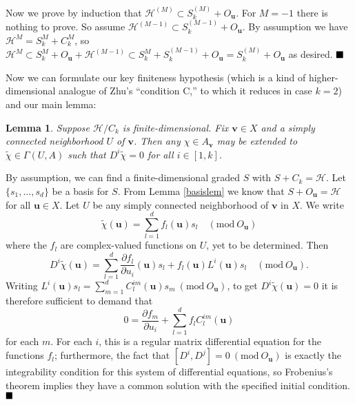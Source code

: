 \documentclass[a4paper,12pt]{article}
\newcommand{\uu}{{\mathbf u}}
\newcommand{\vv}{{\mathbf v}}
\newcommand{\F}{{\mathcal H}}
\newcommand{\done}{$\hfill \hfill \blacksquare$ \bigskip}
\newcommand{\Mod}{\mathrm{mod}\ }
\newcommand{\chit}{\tilde{\chi}}
\newtheorem{lem}[defn]{Lemma}
\newcommand{\oproof}[1]{\noindent {\bf Proof#1.\ }}
\begin{document}
Now we prove by induction that $\F^{(M)} \subset S_k^{(M)} + O_\uu$.  For $M=-1$ there is nothing to prove.  So assume $\F^{(M-1)} \subset S_k^{(M-1)} + O_\uu$.
By assumption we have $\F^M = S_k^M + C_k^M$, so $\F^M \subset S_k^M + O_\uu + \F^{(M-1)} \subset S_k^M + S_k^{(M-1)} + O_\uu = S_k^{(M)} + O_\uu$ as desired. \done

Now we can formulate our key finiteness hypothesis (which is a kind of higher-dimensional analogue of Zhu's ``condition C,'' to which
it reduces in case $k=2$) and our main lemma:
\begin{lem} \label{api} Suppose $\F / C_k$ is finite-dimensional.  Fix $\vv \in X$ and a simply connected neighborhood $U$ of $\vv$.  
Then any $\chi \in A_\vv$ may be extended to
$\chit \in \Gamma(U,A)$ such that $D^i \chit = 0$ for all $i \in [1,k]$.
\end{lem}
\oproof{} By assumption, we can find a finite-dimensional graded $S$ with $S + C_k = \F$.  Let $\{s_1, \dots, s_d\}$ be a basis for $S$.
From Lemma \ref{basislem} we know that $S + O_\uu = \F$ for all $\uu \in X$.  Let $U$ be any simply connected neighborhood of $\vv$ in $X$.  We write
\begin{equation}
\chit(\uu) = \sum_{l=1}^d f_l(\uu) s_l \quad (\Mod O_\uu)
\end{equation}
where the $f_l$ are complex-valued functions on $U$, yet to be determined.  Then
\begin{equation}
D^i \chit(\uu) = \sum_{l=1}^d \frac{\partial f_l}{\partial u_i}(\uu) s_l + f_l(\uu) L^i(\uu) s_l \quad (\Mod O_\uu).
\end{equation}
Writing $L^i(\uu) s_l = \sum_{m = 1}^d C^{im}_l(\uu) s_m \ (\Mod O_\uu)$, to get $D^i \chit(\uu) = 0$ it is therefore
sufficient to demand that
\begin{equation} \label{eqd}
0 = \frac{\partial f_m}{\partial u_i} + \sum_{l=1}^d f_l C^{im}_l (\uu)
\end{equation}
for each $m$.  For each $i$, this is a regular matrix
differential equation for the functions $f_l$; furthermore, the fact that $[D^i, D^j] = 0 \ (\Mod O_\uu)$ is exactly the integrability condition for this
system of differential equations, so Frobenius's theorem \cite{Spivak} implies they have a common solution with
the specified initial condition. \done
\end{document}
